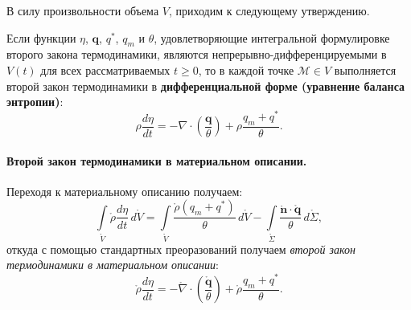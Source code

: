 В силу произвольности объема $V$, приходим к следующему утверждению. 

\begin{theorem*}
	Если функции $\eta$, $\mathbf{q}$, $q^{\ast}$, $q_m$ и $\theta$, удовлетворяющие интегральной формулировке второго закона термодинамики, являются непрерывно-дифференцируемыми в $V(t)$ для всех рассматриваемых $t \geqslant 0$, то в каждой точке  $\mathcal{M} \in V$ выполняется второй закон термодинамики в \textbf{дифференциальной форме (уравнение баланса энтропии)}:
	\begin{equation*}
		\rho \frac{d\eta}{dt} = - \nabla \cdot \left(\frac{\mathbf{q}}{\theta}\right) + \rho \frac{q_m + q^{\ast}}{\theta}.
	\end{equation*}
	
\paragraph{Второй закон термодинамики в материальном описании. } Переходя к материальному описанию получаем:
\begin{equation*}
	\int\limits_{\mathring{V}} \mathring{\rho} \frac{d\eta}{dt} \, d\mathring{V} = \int\limits_{\mathring{V}} \frac{\mathring{\rho}(q_m + q^{\ast})}{\theta} \, d\mathring{V} - \int\limits_{\mathring{\Sigma}} \frac{\mathring{\mathbf{n}} \cdot \mathring{\mathbf{q}}}{\theta} \, d\mathring{\Sigma},
\end{equation*}
откуда с помощью стандартных преоразований получаем \textit{второй закон термодинамики в материальном описании}:
\begin{equation*}
	\mathring{\rho} \frac{d\eta}{dt} = - \mathring{\nabla} \cdot \left(\frac{\mathring{\mathbf{q}}}{\theta}\right) + \mathring{\rho} \frac{q_m + q^{\ast}}{\theta}.
\end{equation*}
\end{theorem*}